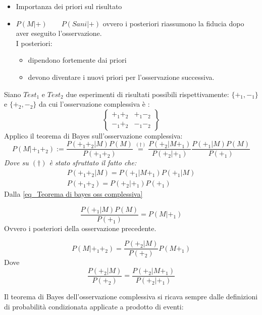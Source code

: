 \documentclass[11pt,a4paper]{book}
\begin{document}
\begin{itemize}
\item Importanza dei priori sul risultato
\item $ P(M|+) \qquad P(\textit{Sani}|+)$ ovvero i posteriori riassumono la fiducia dopo aver eseguito l'osservazione. \\
I posteriori:
\begin{itemize}
\item dipendono fortemente dai priori
\item devono diventare i nuovi priori per l'osservazione successiva.
\end{itemize}
\end{itemize}
Siano $ Test_1 $ e $ Test_2 $ due esperimenti di risultati possibili rispettivamente: $ \{+_1,-_1\} $ e $ \{+_2,-_2\} $ da cui l'osservazione complessiva è :
\begin{equation}
\begin{Bmatrix}
 +_1+_2 & +_1-_2 \\
-_1+_2 & -_1-_2
\end{Bmatrix}
\end{equation}
Applico il teorema di Bayes sull'osservazione complessiva:
\begin{equation}
P(M|+_1+_2) :=\frac{P(+_1+_2|M)P(M)}{P(+_1+_2)} \stackrel{(\dag)}{=} \frac{P(+_2|M+_1)}{P(+_2|+_1)}\frac{P(+_1|M)P(M)}{P(+_1)} \label{eq_Teorema di bayes oss complessiva}
\end{equation}
\textit{Dove su $ (\dag) $ è stato sfruttato il fatto che:}
\begin{eqnarray}
P(+_1 +_2 |M) = P(+_1|M+_1)P(+_1|M) \\
P(+_1+_2) = P(+_2| +_1) P(+_1)
\end{eqnarray}
Dalla \eqref{eq_Teorema di bayes oss complessiva}
\begin{description}
\item \begin{equation}
\frac{P(+_1|M)P(M)}{P(+_1)}  = P(M|+_1)
\end{equation}
Ovvero i posteriori della osservazione precedente.
\item \begin{equation}
P(M|+_1+_2)=\frac{P(+_2|M)}{P(+_2)} P(M+_1)
\end{equation}
Dove 
\begin{equation}
\frac{P(+_2|M)}{P(+_2)} = \frac{P(+_2|M+_1)}{P(+_2|+_1)}
\end{equation}
\end{description}
Il teorema di Bayes dell'osservazione complessiva si ricava sempre dalle definizioni di probabilità condizionata applicate a prodotto di eventi:
\end{document}
